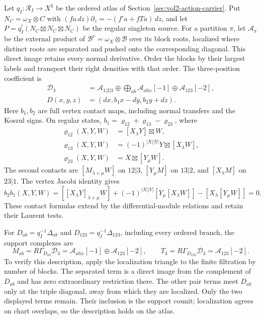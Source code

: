 Let $q_I:\mathscr R_I\to X^3$ be the ordered atlas of
Section~\ref{sec:vol2-action-carrier}. Put
$N_C=\omega_X\otimes C$ with
$(fa\,dz)\partial_z=-(f'a+fTa)\,dz$, and let
$P=q_I^!(N_C\boxtimes N_C\boxtimes N_C)$ be the regular
singleton source. For a partition $\pi$, let $\mathcal A_\pi$
be the external product of $\mathcal B^r=\omega_X\otimes\mathcal B$
over its block roots, localized where distinct roots are
separated and pushed onto the corresponding diagonal. This
direct image retains every normal derivative. Order the blocks
by their largest labels and transport their right densities
with that order. The three-position coefficient is
\begin{equation}\label{eq:vol2-supported-three-complex}
 \begin{split}
 \mathcal D_3&=\mathcal A_{1|2|3}
       \oplus\bigoplus_{ab}\mathcal A_{ab|c}[-1]
       \oplus\mathcal A_{123}[-2],\\
 D(x,y,z)&=(dx,b_1x-dy,b_2y+dz).
 \end{split}
\end{equation}
Here $b_1,b_2$ are full vertex contact maps, including
normal transfers and the Koszul signs. On regular states,
$b_1=\varrho_{12}+\varrho_{13}-\varrho_{23}$, where
\[
 \begin{aligned}
 \varrho_{12}(X,Y,W)&=[X_\lambda Y]\boxtimes W,\\
 \varrho_{13}(X,Y,W)&=(-1)^{|X||Y|}Y\boxtimes[X_\lambda W],\\
 \varrho_{23}(X,Y,W)&=X\boxtimes[Y_\mu W].
 \end{aligned}
\]
The second contacts are $[M_{\lambda+\mu}W]$ on $12|3$,
$[Y_\mu M]$ on $13|2$, and $[X_\lambda M]$ on $23|1$.
The vertex Jacobi identity gives
\[
 b_2b_1(X,Y,W)=[[X_\lambda Y]_{\lambda+\mu}W]
 +(-1)^{|X||Y|}[Y_\mu[X_\lambda W]]-[X_\lambda[Y_\mu W]]=0.
\]
These contact formulas extend by the differential-module
relations and retain their Laurent tests.

For $D_{ab}=q_I^{-1}\Delta_{ab}$ and
$D_{123}=q_I^{-1}\Delta_{123}$, including every ordered branch,
the support complexes are
\begin{equation}\label{eq:vol2-supported-pair-complexes}
 M_{ab}=R\Gamma_{D_{ab}}\mathcal D_3
       =\mathcal A_{ab|c}[-1]\oplus\mathcal A_{123}[-2],
 \qquad T_3=R\Gamma_{D_{123}}\mathcal D_3
       =\mathcal A_{123}[-2].
\end{equation}
To verify this description, apply the localization triangle to
the finite filtration by number of blocks. The separated term
is a direct image from the complement of $D_{ab}$ and has zero
extraordinary restriction there. The other pair terms meet
$D_{ab}$ only at the triple diagonal, away from which they are
localized. Only the two displayed terms remain. Their
inclusion is the support counit; localization agrees on chart
overlaps, so the description holds on the atlas.

